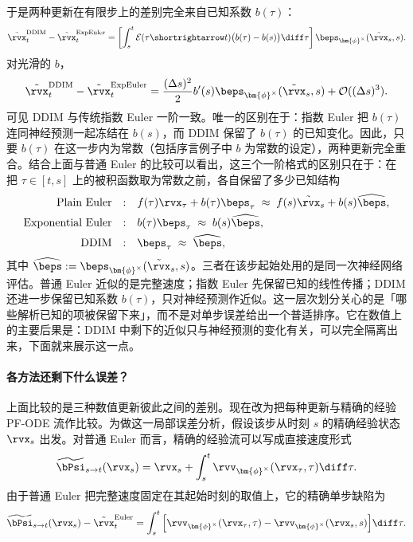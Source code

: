 于是两种更新在有限步上的差别完全来自已知系数 $b(\tau)$：
\[
\tilde\rvx_t^{\mathrm{DDIM}}
-
\tilde\rvx_t^{\mathrm{ExpEuler}}
=
\left[
\int_s^t
\mathcal E(\tau\shortrightarrow t)
\bigl(b(\tau)-b(s)\bigr)
\diff\tau
\right]
\beps_{\bm{\phi}^\times}(\tilde\rvx_s,s).
\]
对光滑的 $b$，
\[
\tilde\rvx_t^{\mathrm{DDIM}}
-
\tilde\rvx_t^{\mathrm{ExpEuler}}
=
\frac{(\Delta s)^2}{2}
b'(s)
\beps_{\bm{\phi}^\times}(\tilde\rvx_s,s)
+
\mathcal O((\Delta s)^3).
\]
可见 DDIM 与传统指数 Euler 一阶一致。唯一的区别在于：指数 Euler 把 $b(\tau)$ 连同神经预测一起冻结在 $b(s)$，而 DDIM 保留了 $b(\tau)$ 的已知变化。因此，只要 $b(\tau)$ 在这一步内为常数（包括序言例子中 $b$ 为常数的设定），两种更新完全重合。结合上面与普通 Euler 的比较可以看出，这三个一阶格式的区别只在于：在把 $\tau\in[t,s]$ 上的被积函数取为常数之前，各自保留了多少已知结构
\[
\begin{array}{rcl}
\text{Plain Euler}
&:&
f(\tau)\rvx_\tau+b(\tau)\beps_\tau
\;\approx\;
f(s)\tilde\rvx_s+b(s)\widehat\beps,
\\[4pt]
\text{Exponential Euler}
&:&
b(\tau)\beps_\tau
\;\approx\;
b(s)\widehat\beps,
\\[4pt]
\text{DDIM}
&:&
\beps_\tau
\;\approx\;
\widehat\beps,
\end{array}
\]
其中
$\widehat\beps
:=
\beps_{\bm{\phi}^\times}(\tilde\rvx_s,s)$。三者在该步起始处用的是同一次神经网络评估。普通 Euler 近似的是完整速度；指数 Euler 先保留已知的线性传播；DDIM 还进一步保留已知系数 $b(\tau)$，只对神经预测作近似。这一层次划分关心的是「哪些解析已知的项被保留下来」，而不是对单步误差给出一个普适排序。它在数值上的主要后果是：DDIM 中剩下的近似只与神经预测的变化有关，可以完全隔离出来，下面就来展示这一点。


\paragraph{各方法还剩下什么误差？}
上面比较的是三种数值更新彼此之间的差别。现在改为把每种更新与精确的经验 PF-ODE 流作比较。为做这一局部误差分析，假设该步从时刻 $s$ 的精确经验状态 $\rvx_s$ 出发。对普通 Euler 而言，精确的经验流可以写成直接速度形式
\[
\widetilde\bPsi_{s\to t}(\rvx_s)
=
\rvx_s
+
\int_s^t
\rvv_{\bm{\phi}^\times}(\rvx_\tau,\tau)
\diff\tau.
\]
由于普通 Euler 把完整速度固定在其起始时刻的取值上，它的精确单步缺陷为
\begin{align*}
\widetilde\bPsi_{s\to t}(\rvx_s)
-
\tilde\rvx_t^{\mathrm{Euler}}
=
\int_s^t
\Big[
\rvv_{\bm{\phi}^\times}(\rvx_\tau,\tau)
-
\rvv_{\bm{\phi}^\times}(\rvx_s,s)
\Big]
\diff\tau.
\end{align*}

